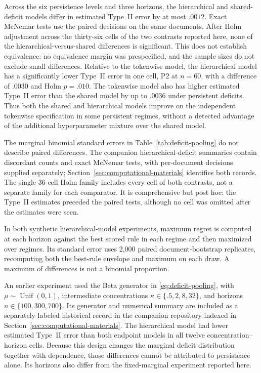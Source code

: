 \documentclass[11pt]{article}
\newcommand{\Unif}{\operatorname{Unif}}
\begin{document}
Across the six persistence levels and three horizons, the hierarchical and
shared-deficit models differ in estimated Type~II error by at most $.0012$.
Exact McNemar tests use the paired decisions on the same documents.  After Holm
adjustment across the thirty-six cells of the two contrasts reported here, none
of the hierarchical-versus-shared differences is significant.  This does not
establish equivalence: no equivalence margin was prespecified, and the sample
sizes do not exclude small differences.  Relative to the tokenwise model, the
hierarchical model has a significantly lower Type~II error in one cell, P2 at
$n=60$, with a difference of $.0030$ and Holm $p=.010$.  The tokenwise model also
has higher estimated Type~II error than the shared model by up to $.0036$ under
persistent deficits.  Thus both the shared and hierarchical models improve on
the independent tokenwise specification in some persistent regimes, without a
detected advantage of the additional hyperparameter mixture over the shared model.

The marginal binomial standard errors in Table~\ref{tab:deficit-pooling} do not
describe paired differences.  The companion hierarchical-deficit summaries contain discordant counts and exact McNemar tests, with per-document decisions supplied separately; Section~\ref{sec:computational-materials} identifies both records.  The single 36-cell Holm family
includes every cell of both contrasts, not a separate family for each comparator.
It is comprehensive but post hoc: the Type~II estimates preceded the paired tests,
although no cell was omitted after the estimates were seen.

In both synthetic hierarchical-model experiments, maximum regret is computed at each horizon
against the best scored rule in each regime and then maximized over regimes.
Its standard error uses 2,000 paired document-bootstrap replicates, recomputing
both the best-rule envelope and maximum on each draw.  A maximum of differences
is not a binomial proportion.

An earlier experiment used the Beta generator in \eqref{eq:deficit-pooling},
with $\mu\sim\Unif(0,1)$, intermediate concentrations
$\kappa\in\{.5,2,8,32\}$, and horizons $n\in\{100,300,700\}$.
Its generator and numerical summary are included as a separately labeled historical record in the companion repository indexed in Section~\ref{sec:computational-materials}.  The hierarchical model had lower estimated Type~II error than
both endpoint models in all twelve concentration--horizon cells.  Because this
design changes the marginal deficit distribution together with dependence,
those differences cannot be attributed to persistence alone.  Its horizons
also differ from the fixed-marginal experiment reported here.
\end{document}
